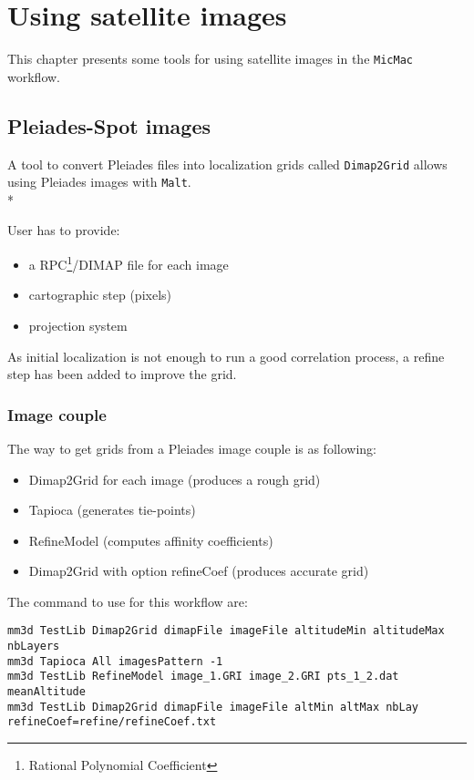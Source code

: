\chapter{Using satellite images}

This chapter presents some tools for using satellite images in the {\tt MicMac} workflow.

\section{Pleiades-Spot images}

A tool to convert Pleiades files into localization grids called {\tt Dimap2Grid} allows using Pleiades images with {\tt Malt}.\\*

User has to provide:
\begin{itemize}
\item a RPC\footnote{Rational Polynomial Coefficient}/DIMAP file for each image 
\item cartographic step (pixels)
\item projection system
\end{itemize}

As initial localization is not enough to run a good correlation process, a refine step has been added to improve the grid.

\subsection{Image couple}

The way to get grids from a Pleiades image couple is as following:

\begin{itemize}
\item Dimap2Grid for each image (produces a rough grid)
\item Tapioca (generates tie-points)
\item RefineModel (computes affinity coefficients)
\item Dimap2Grid with option refineCoef (produces accurate grid)
\end{itemize}

The command to use for this workflow are:
\begin{verbatim}
mm3d TestLib Dimap2Grid dimapFile imageFile altitudeMin altitudeMax nbLayers
mm3d Tapioca All imagesPattern -1
mm3d TestLib RefineModel image_1.GRI image_2.GRI pts_1_2.dat meanAltitude
mm3d TestLib Dimap2Grid dimapFile imageFile altMin altMax nbLay refineCoef=refine/refineCoef.txt
\end{verbatim}

